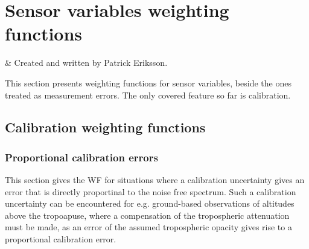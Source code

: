 %
%
\chapter{Sensor variables weighting functions}


%
%
 & Created and written by Patrick Eriksson.\\
\stophistory


%
%
%



%
%
This section presents weighting functions for sensor variables, beside the
ones treated as measurement errors. The only covered feature so far is calibration.




\section{Calibration weighting functions}
 
 \subsection{Proportional calibration errors} 
 This section gives the WF for situations where a calibration
 uncertainty gives an error that is directly proportinal to the noise
 free spectrum.  Such a calibration uncertainty can be encountered for
 e.g. ground-based observations of altitudes above the tropoapuse,
 where a compensation of the tropospheric attenuation must be made, as an
 error of the assumed tropospheric opacity gives rise to a proportional 
 calibration error.

